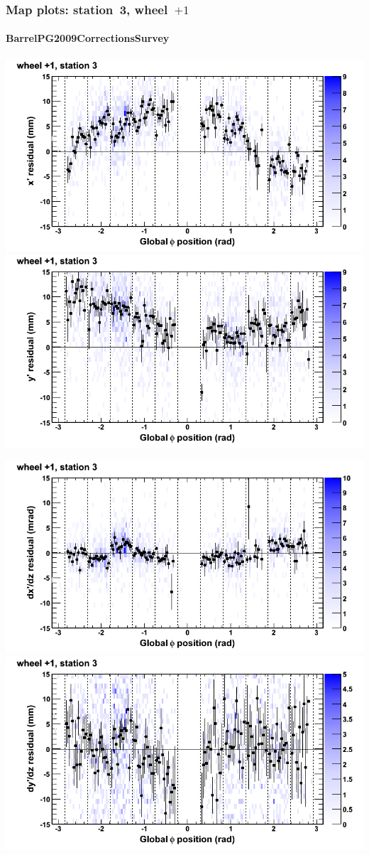\documentclass[compress]{beamer}
\begin{document}
\begin{frame}
\frametitle{Map plots: station~3, wheel~$+1$}
\framesubtitle{BarrelPG2009CorrectionsSurvey}
\includegraphics[width=0.5\linewidth]{mapplots_01/DTvsphi_st3whD_x.png}
\includegraphics[width=0.5\linewidth]{mapplots_01/DTvsphi_st3whD_y.png}

\includegraphics[width=0.5\linewidth]{mapplots_01/DTvsphi_st3whD_dxdz.png}
\includegraphics[width=0.5\linewidth]{mapplots_01/DTvsphi_st3whD_dydz.png}
\end{frame}
\end{document}
